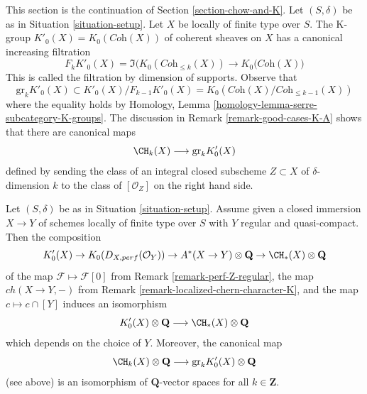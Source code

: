 \noindent
This section is the continuation of Section \ref{section-chow-and-K}.
Let $(S, \delta)$ be as in Situation \ref{situation-setup}.
Let $X$ be locally of finite type over $S$. The K-group
$K'_0(X) = K_0(\textit{Coh}(X))$ of coherent sheaves on $X$
has a canonical increasing filtration
$$
F_kK'_0(X) =
\Im\Big(K_0(\textit{Coh}_{\leq k}(X)) \to K_0(\textit{Coh}(X)\Big)
$$
This is called the filtration by dimension of supports. Observe that
$$
\text{gr}_k K'_0(X) \subset K'_0(X)/F_{k - 1}K'_0(X) =
K_0(\textit{Coh}(X)/\textit{Coh}_{\leq k - 1}(X))
$$
where the equality holds
by Homology, Lemma \ref{homology-lemma-serre-subcategory-K-groups}.
The discussion in Remark \ref{remark-good-cases-K-A} shows
that there are canonical maps
$$
\CH_k(X) \longrightarrow \text{gr}_k K'_0(X)
$$
defined by sending the class of an integral closed subscheme
$Z \subset X$ of $\delta$-dimension $k$ to the class of
$[\mathcal{O}_Z]$ on the right hand side.

\begin{proposition}
\label{proposition-K-tensor-Q}
Let $(S, \delta)$ be as in Situation \ref{situation-setup}. Assume given a
closed immersion $X \to Y$ of schemes locally of finite type over $S$
with $Y$ regular and quasi-compact. Then the composition
$$
K'_0(X) \to
K_0(D_{X, perf}(\mathcal{O}_Y)) \to
A^*(X \to Y) \otimes \mathbf{Q} \to
\CH_*(X) \otimes \mathbf{Q}
$$
of the map $\mathcal{F} \mapsto \mathcal{F}[0]$ from
Remark \ref{remark-perf-Z-regular}, the map $ch(X \to Y, -)$ from
Remark \ref{remark-localized-chern-character-K}, and
the map $c \mapsto c \cap [Y]$ induces an isomorphism
$$
K'_0(X) \otimes \mathbf{Q}
\longrightarrow
\CH_*(X) \otimes \mathbf{Q}
$$
which depends on the choice of $Y$. Moreover, the canonical map
$$
\CH_k(X) \otimes \mathbf{Q}
\longrightarrow
\text{gr}_k K'_0(X) \otimes \mathbf{Q}
$$
(see above) is an isomorphism of $\mathbf{Q}$-vector spaces for all
$k \in \mathbf{Z}$.
\end{proposition}

